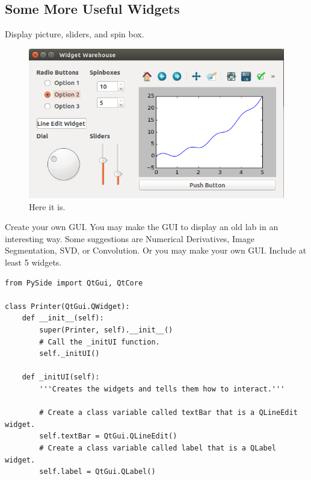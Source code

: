 \subsection*{Some More Useful Widgets}
Display picture, sliders, and spin box.
\begin{figure}
\includegraphics[width=\textwidth]{widgetwarehouse.png}
\caption{Here it is.}
\end{figure}

\begin{problem}
Create your own GUI.  You may make the GUI to display an old lab in an interesting way.  Some suggestions are Numerical Derivatives, Image Segmentation, SVD, or Convolution.  Or you may make your own GUI.  Include at least 5 widgets.
\end{problem}



\begin{lstlisting}
from PySide import QtGui, QtCore

class Printer(QtGui.QWidget):
	def __init__(self):
		super(Printer, self).__init__()
		# Call the _initUI function.
		self._initUI()
	
	def _initUI(self):
		'''Creates the widgets and tells them how to interact.'''
		
		# Create a class variable called textBar that is a QLineEdit widget.
		self.textBar = QtGui.QLineEdit()
		# Create a class variable called label that is a QLabel widget.
		self.label = QtGui.QLabel()

\end{lstlisting}



